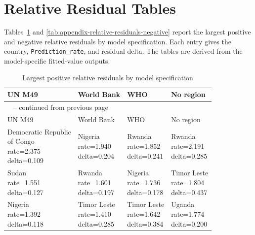 \documentclass[runningheads]{llncs}
\begin{document}
\section{Relative Residual Tables}

Tables~\ref{tab:appendix-relative-residuals-positive} and \ref{tab:appendix-relative-residuals-negative} report the largest positive and negative relative residuals by model specification. Each entry gives the country, \texttt{Prediction\_rate}, and residual delta. The tables are derived from the model-specific fitted-value outputs.

{\scriptsize
\renewcommand{\arraystretch}{1.12}
\setlength{\tabcolsep}{3pt}
\begin{longtable}{p{}p{}p{}p{}}
\caption{Largest positive relative residuals by model specification}\label{tab:appendix-relative-residuals-positive}\\
\hline
UN M49 & World Bank & WHO & No region \\
\hline
\endfirsthead
\multicolumn{4}{l}{\tablename\ \thetable{} -- continued from previous page}\\
\hline
UN M49 & World Bank & WHO & No region \\
\hline
\endhead
\shortstack[l]{Democratic Republic\\ of Congo\\ rate=2.375\\ delta=0.109} &\shortstack[l]{Nigeria\\ rate=1.940\\ delta=0.204} &\shortstack[l]{Rwanda\\ rate=1.852\\ delta=0.241} &\shortstack[l]{Rwanda\\ rate=2.191\\ delta=0.285} \\
\hline
\shortstack[l]{Sudan\\ rate=1.551\\ delta=0.127} &\shortstack[l]{Rwanda\\ rate=1.601\\ delta=0.197} &\shortstack[l]{Nigeria\\ rate=1.736\\ delta=0.178} &\shortstack[l]{Timor Leste\\ rate=1.804\\ delta=0.437} \\
\hline
\shortstack[l]{Nigeria\\ rate=1.392\\ delta=0.118} &\shortstack[l]{Timor Leste\\ rate=1.410\\ delta=0.285} &\shortstack[l]{Timor Leste\\ rate=1.642\\ delta=0.384} &\shortstack[l]{Uganda\\ rate=1.774\\ delta=0.200} \\

\end{longtable}}
\end{document}
